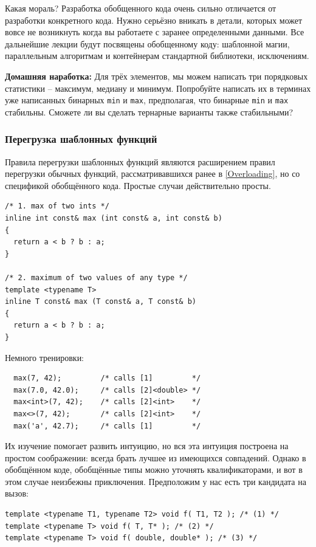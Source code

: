\documentclass[a4paper,12pt,oneside]{article}
\begin{document}
Какая мораль? Разработка обобщенного кода очень сильно отличается от разработки конкретного кода. Нужно серьёзно вникать в детали, которых может вовсе не возникнуть когда вы работаете с заранее определенными данными. Все дальнейшие лекции будут посвящены обобщенному коду: шаблонной магии, параллельным алгоритмам и контейнерам стандартной библиотеки, исключениям. 

\textbf{Домашняя наработка:} Для трёх элементов, мы можем написать три порядковых статистики -- максимум, медиану и минимум. Попробуйте написать их в терминах уже написанных бинарных \lstinline!min! и \lstinline!max!, предполагая, что бинарные \lstinline!min! и \lstinline!max! стабильны. Сможете ли вы сделать тернарные варианты также стабильными?

\subsubsection{Перегрузка шаблонных функций}\label{TemplOverloading}

Правила перегрузки шаблонных функций являются расширением правил перегрузки обычных функций, рассматривавшихся ранее в \ref{Overloading}, но со спецификой обобщённого кода. Простые случаи действительно просты. 

\begin{lstlisting}
/* 1. max of two ints */
inline int const& max (int const& a, int const& b)
{
  return a < b ? b : a;
}

/* 2. maximum of two values of any type */
template <typename T>
inline T const& max (T const& a, T const& b)
{
  return a < b ? b : a;
}
\end{lstlisting}

Немного тренировки:

\begin{lstlisting}
  max(7, 42);         /* calls [1]         */
  max(7.0, 42.0);     /* calls [2]<double> */
  max<int>(7, 42);    /* calls [2]<int>    */
  max<>(7, 42);       /* calls [2]<int>    */
  max('a', 42.7);     /* calls [1]         */
\end{lstlisting}

Их изучение помогает развить интуицию, но вся эта интуиция построена на простом соображении: всегда брать лучшее из имеющихся совпадений. Однако в обобщённом коде, обобщённые типы можно уточнять квалификаторами, и вот в этом случае неизбежны приключения. Предположим у нас есть три кандидата на вызов:

\begin{lstlisting}
template <typename T1, typename T2> void f( T1, T2 ); /* (1) */
template <typename T> void f( T, T* ); /* (2) */
template <typename T> void f( double, double* ); /* (3) */
\end{lstlisting}
\end{document}
